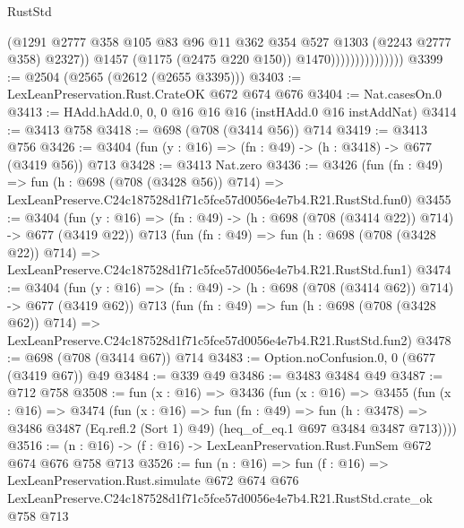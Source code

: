\begin{lexlean}{RustStd}
\begin{coremodule}
                                    (@1291
                                      @2777
                                      @358
                                      @105
                                      @83
                                      @96
                                      @11
                                      @362
                                      @354
                                      @527
                                      @1303
                                      (@2243 @2777 @358)
                                      @2327))
                                  @1457
                                  (@1175 (@2475 @220 @150))
                                  @1470)))))))))))))))
@3399 := @2504 (@2565 (@2612 (@2655 @3395)))
@3403 := LexLeanPreservation.Rust.CrateOK @672 @674 @676
@3404 := Nat.casesOn.{0}
@3413 := HAdd.hAdd.{0, 0, 0} @16 @16 @16 (instHAdd.{0} @16 instAddNat)
@3414 := @3413 @758
@3418 := @698 (@708 (@3414 @56)) @714
@3419 := @3413 @756
@3426 := @3404 (fun (y : @16) => (fn : @49) -> (h : @3418) -> @677 (@3419 @56)) @713
@3428 := @3413 Nat.zero
@3436 := @3426
    (fun (fn : @49) =>
    fun (h : @698 (@708 (@3428 @56)) @714) =>
    LexLeanPreserve.C24c187528d1f71c5fce57d0056e4e7b4.R21.RustStd.fun0)
@3455 := @3404
    (fun (y : @16) => (fn : @49) -> (h : @698 (@708 (@3414 @22)) @714) -> @677 (@3419 @22))
    @713
    (fun (fn : @49) =>
    fun (h : @698 (@708 (@3428 @22)) @714) =>
    LexLeanPreserve.C24c187528d1f71c5fce57d0056e4e7b4.R21.RustStd.fun1)
@3474 := @3404
    (fun (y : @16) => (fn : @49) -> (h : @698 (@708 (@3414 @62)) @714) -> @677 (@3419 @62))
    @713
    (fun (fn : @49) =>
    fun (h : @698 (@708 (@3428 @62)) @714) =>
    LexLeanPreserve.C24c187528d1f71c5fce57d0056e4e7b4.R21.RustStd.fun2)
@3478 := @698 (@708 (@3414 @67)) @714
@3483 := Option.noConfusion.{0, 0} (@677 (@3419 @67)) @49
@3484 := @339 @49
@3486 := @3483 @3484 @49
@3487 := @712 @758
@3508 := fun (x : @16) =>
  @3436
    (fun (x : @16) =>
    @3455
      (fun (x : @16) =>
      @3474
        (fun (x : @16) =>
        fun (fn : @49) =>
        fun (h : @3478) =>
        @3486 @3487 (Eq.refl.{2} (Sort 1) @49) (heq_of_eq.{1} @697 @3484 @3487 @713))))
@3516 := (n : @16) -> (f : @16) -> LexLeanPreservation.Rust.FunSem @672 @674 @676 @758 @713
@3526 := fun (n : @16) =>
  fun (f : @16) =>
  LexLeanPreservation.Rust.simulate
    @672
    @674
    @676
    LexLeanPreserve.C24c187528d1f71c5fce57d0056e4e7b4.R21.RustStd.crate_ok
    @758
    @713
\end{coremodule}
\end{lexlean}
